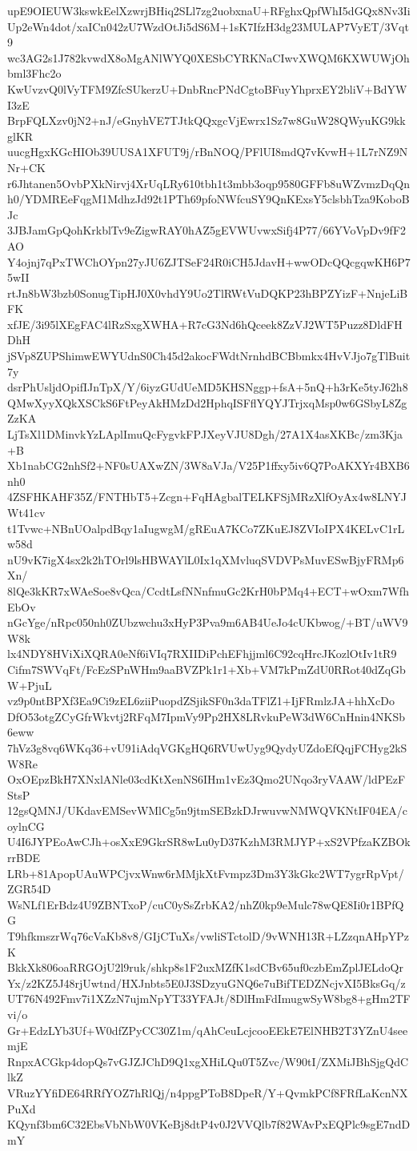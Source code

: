 upE9OIEUW3kswkEelXzwrjBHiq2SLl7zg2uobxnaU+RFghxQpfWhI5dGQx8Nv3Ii
Up2eWn4dot/xaICn042zU7WzdOtJi5dS6M+1sK7IfzH3dg23MULAP7VyET/3Vqt9
wc3AG2s1J782kvwdX8oMgANlWYQ0XESbCYRKNaCIwvXWQM6KXWUWjOhbml3Fhc2o
KwUvzvQ0lVyTFM9ZfcSUkerzU+DnbRncPNdCgtoBFuyYhprxEY2bliV+BdYWI3zE
BrpFQLXzv0jN2+nJ/eGnyhVE7TJtkQQxgcVjEwrx1Sz7w8GuW28QWyuKG9kkglKR
uucgHgxKGcHIOb39UUSA1XFUT9j/rBnNOQ/PFlUI8mdQ7vKvwH+1L7rNZ9NNr+CK
r6Jhtanen5OvbPXkNirvj4XrUqLRy610tbh1t3mbb3oqp9580GFFb8uWZvmzDqQn
h0/YDMREeFqgM1MdhzJd92t1PTh69pfoNWfcuSY9QnKExsY5clsbhTza9KoboBJc
3JBJamGpQohKrkblTv9eZigwRAY0hAZ5gEVWUvwxSifj4P77/66YVoVpDv9fF2AO
Y4ojnj7qPxTWChOYpn27yJU6ZJTSeF24R0iCH5JdavH+wwODcQQcgqwKH6P75wII
rtJn8bW3bzb0SonugTipHJ0X0vhdY9Uo2TlRWtVuDQKP23hBPZYizF+NnjeLiBFK
xfJE/3i95lXEgFAC4lRzSxgXWHA+R7cG3Nd6hQceek8ZzVJ2WT5Puzz8DldFHDhH
jSVp8ZUPShimwEWYUdnS0Ch45d2akocFWdtNrnhdBCBbmkx4HvVJjo7gTlBuit7y
dsrPhUsljdOpifIJnTpX/Y/6iyzGUdUeMD5KHSNggp+fsA+5nQ+h3rKe5tyJ62h8
QMwXyyXQkXSCkS6FtPeyAkHMzDd2HphqISFflYQYJTrjxqMsp0w6GSbyL8ZgZzKA
LjTsXl1DMinvkYzLAplImuQcFygvkFPJXeyVJU8Dgh/27A1X4asXKBc/zm3Kja+B
Xb1nabCG2nhSf2+NF0sUAXwZN/3W8aVJa/V25P1ffxy5iv6Q7PoAKXYr4BXB6nh0
4ZSFHKAHF35Z/FNTHbT5+Zcgn+FqHAgbalTELKFSjMRzXlfOyAx4w8LNYJWt41cv
t1Tvwc+NBnUOalpdBqy1aIugwgM/gREuA7KCo7ZKuEJ8ZVIoIPX4KELvC1rLw58d
nU9vK7igX4sx2k2hTOrl9lsHBWAYlL0Ix1qXMvluqSVDVPsMuvESwBjyFRMp6Xn/
8lQe3kKR7xWAeSoe8vQca/CcdtLsfNNnfmuGc2KrH0bPMq4+ECT+wOxm7WfhEbOv
nGcYge/nRpc050nh0ZUbzwchu3xHyP3Pva9m6AB4UeJo4cUKbwog/+BT/uWV9W8k
lx4NDY8HViXiXQRA0eNf6iVIq7RXIIDiPchEFhjjml6C92cqHrcJKozlOtIv1tR9
Cifm7SWVqFt/FcEzSPnWHm9aaBVZPk1r1+Xb+VM7kPmZdU0RRot40dZqGbW+PjuL
vz9p0ntBPXf3Ea9Ci9zEL6ziiPuopdZSjikSF0n3daTFlZ1+IjFRmlzJA+hhXcDo
DfO53otgZCyGfrWkvtj2RFqM7IpmVy9Pp2HX8LRvkuPeW3dW6CnHnin4NKSb6eww
7hVz3g8vq6WKq36+vU91iAdqVGKgHQ6RVUwUyg9QydyUZdoEfQqjFCHyg2kSW8Re
OxOEpzBkH7XNxlANle03cdKtXenNS6IHm1vEz3Qmo2UNqo3ryVAAW/ldPEzFStsP
12gsQMNJ/UKdavEMSevWMlCg5n9jtmSEBzkDJrwuvwNMWQVKNtIF04EA/coylnCG
U4I6JYPEoAwCJh+osXxE9GkrSR8wLu0yD37KzhM3RMJYP+xS2VPfzaKZBOkrrBDE
LRb+81ApopUAuWPCjvxWnw6rMMjkXtFvmpz3Dm3Y3kGkc2WT7ygrRpVpt/ZGR54D
WsNLf1ErBdz4U9ZBNTxoP/cuC0ySsZrbKA2/nhZ0kp9eMulc78wQE8Ii0r1BPfQG
T9hfkmszrWq76cVaKb8v8/GIjCTuXs/vwliSTctolD/9vWNH13R+LZzqnAHpYPzK
BkkXk806oaRRGOjU2l9ruk/shkp8s1F2uxMZfK1sdCBv65uf0czbEmZplJELdoQr
Yx/z2KZ5J48rjUwtnd/HXJnbts5E0J3SDzyuGNQ6e7uBifTEDZNcjvXI5BksGq/z
UT76N492Fmv7i1XZzN7ujmNpYT33YFAJt/8DlHmFdImugwSyW8bg8+gHm2TFvi/o
Gr+EdzLYb3Uf+W0dfZPyCC30Z1m/qAhCeuLcjcooEEkE7ElNHB2T3YZnU4seemjE
RnpxACGkp4dopQs7vGJZJChD9Q1xgXHiLQu0T5Zvc/W90tI/ZXMiJBhSjgQdClkZ
VRuzYYfiDE64RRfYOZ7hRlQj/n4ppgPToB8DpeR/Y+QvmkPCf8FRfLaKcnNXPuXd
KQynf3bm6C32EbsVbNbW0VKeBj8dtP4v0J2VVQlb7f82WAvPxEQPlc9sgE7ndDmY

